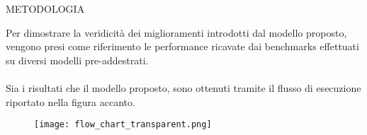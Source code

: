 \begin{frame}{METODOLOGIA}
    \begin{minipage}{\linewidth}
        \centering
        \begin{minipage}{0.40\linewidth}
            Per dimostrare la veridicità dei miglioramenti introdotti dal modello proposto, vengono presi come riferimento le performance ricavate dai benchmarks effettuati su diversi modelli pre-addestrati.\\
            \\
            Sia i risultati che il modello proposto, sono ottenuti tramite il flusso di esecuzione riportato nella figura accanto.
        \end{minipage}
        \hspace{0.3cm}
        \begin{minipage}{0.55\linewidth}
            \begin{figure}
                \texttt{[image: flow\_chart\_transparent.png]}
            \end{figure}
        \end{minipage}
    \end{minipage}    
\end{frame}
